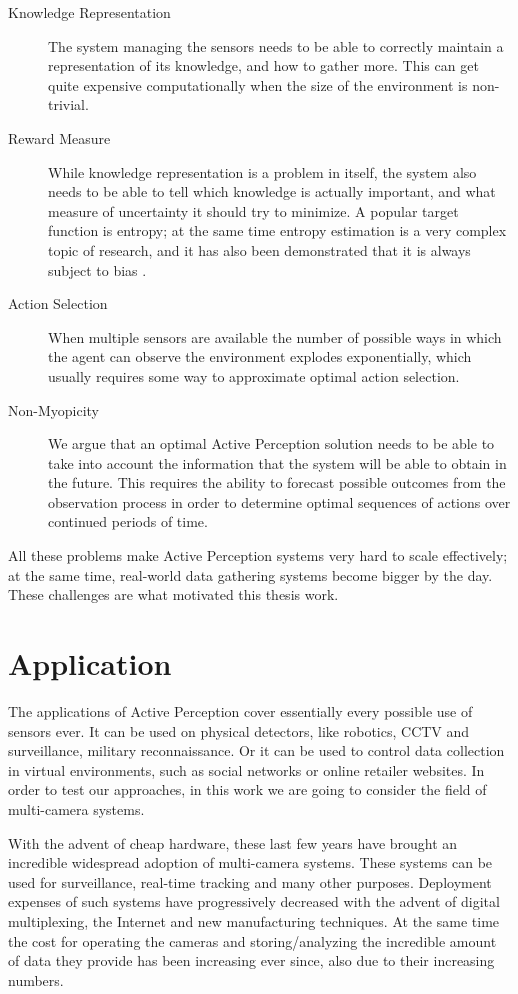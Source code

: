\begin{description}
\item[Knowledge Representation] The system managing the sensors needs to be able to correctly
maintain a representation of its knowledge, and how to gather more. This can get quite expensive
computationally when the size of the environment is non-trivial.
\item[Reward Measure] While knowledge representation is a problem in itself, the system also needs
to be able to tell which knowledge is actually important, and what measure of uncertainty it should
try to minimize. A popular target function is entropy; at the same time entropy estimation is a very
complex topic of research, and it has also been demonstrated that it is always subject to bias
\cite{cit:badentropy}.
\item[Action Selection] When multiple sensors are available the number of possible ways in which the
agent can observe the environment explodes exponentially, which usually requires some way to
approximate optimal action selection.
\item[Non-Myopicity] We argue that an optimal Active Perception solution needs to be able to take into
account the information that the system will be able to obtain in the future. This requires the
ability to forecast possible outcomes from the observation process in order to determine optimal
sequences of actions over continued periods of time.
\end{description}

All these problems make Active Perception systems very hard to scale effectively; at the same time,
real-world data gathering systems become bigger by the day. These challenges are what motivated this
thesis work.

\section{Application}

The applications of Active Perception cover essentially every possible use of sensors ever. It can
be used on physical detectors, like robotics, CCTV and surveillance, military reconnaissance. Or it
can be used to control data collection in virtual environments, such as social networks or online
retailer websites. In order to test our approaches, in this work we are going to consider the field
of multi-camera systems.

With the advent of cheap hardware, these last few years have brought an incredible widespread
adoption of multi-camera systems. These systems can be used for surveillance, real-time tracking and
many other purposes. Deployment expenses of such systems have progressively decreased with the
advent of digital multiplexing, the Internet and new manufacturing techniques. At the same time the
cost for operating the cameras and storing/analyzing the incredible amount of data they provide has
been increasing ever since, also due to their increasing numbers.


